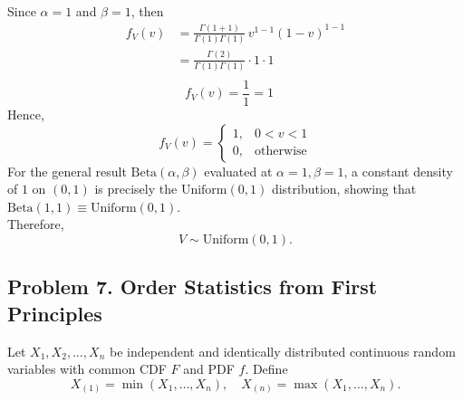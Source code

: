 \documentclass[letterpaper,12pt]{article}
\begin{document}
\begin{enumerate}[(a)]
\begin{list}{}{}
        Since $\alpha = 1$ and $\beta = 1$, then
        \begin{align*}
        f_V(v) &= \frac{\Gamma(1+1)}{\Gamma(1)\Gamma(1)} \, v^{1-1} (1-v)^{1-1} \\
        &= \frac{\Gamma(2)}{\Gamma(1)\Gamma(1)} \cdot 1 \cdot 1 \\ 
        \end{align*}
        \[  \boxed{f_V(v)  = \frac{1}{1} = 1 \quad}\]
        Hence,
        \[        f_V(v) = \begin{cases} 1, & 0 < v < 1 \\[0.5em] 0, & \text{otherwise} \end{cases}\]
        For the general result $\text{Beta}(\alpha, \beta)$ evaluated at $\alpha = 1, \beta = 1$, a constant density of $1$ on $(0,1)$ is precisely the $\text{Uniform}(0,1)$ distribution, showing that $\text{Beta}(1,1) \equiv \text{Uniform}(0,1)$.\\
        Therefore, 
        $$V \sim \text{Uniform}(0, 1).$$
    \end{list}
\end{enumerate}

\vspace{1.5em}

\subsection*{Problem 7. Order Statistics from First Principles \hfill \mdseries[14 points]}

Let $X_1, X_2, \dots, X_n$ be independent and identically distributed continuous random variables with common CDF $F$ and PDF $f$. Define
\[X_{(1)} = \min(X_1, \dots, X_n), \quad X_{(n)} = \max(X_1, \dots, X_n).
\]
\end{document}
